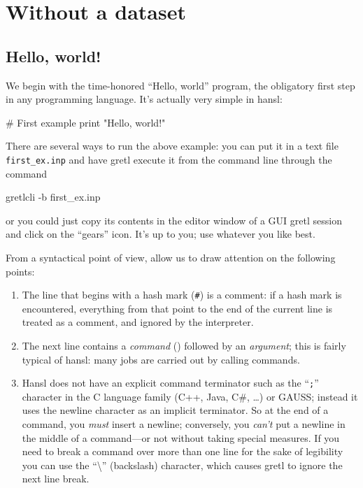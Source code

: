 \part{Without a dataset}

\chapter{Hello, world!}

We begin with the time-honored ``Hello, world'' program, the
obligatory first step in any programming language. It's actually very
simple in hansl:
\begin{code}
  # First example
  print "Hello, world!"
\end{code}

There are several ways to run the above example: you can put it in a
text file \texttt{first\_ex.inp} and have gretl execute it from the
command line through the command
\begin{code}
  gretlcli -b first_ex.inp
\end{code}
or you could just copy its contents in the editor window of a GUI
gretl session and click on the ``gears'' icon. It's up to you; use
whatever you like best.

From a syntactical point of view, allow us to draw attention on
the following points:
\begin{enumerate}
\item The line that begins with a hash mark (\texttt{\#}) is a
  comment: if a hash mark is encountered, everything from that point
  to the end of the current line is treated as a comment, and ignored
  by the interpreter.
\item The next line contains a \emph{command} () followed
  by an \emph{argument}; this is fairly typical of hansl: many jobs
  are carried out by calling commands.
\item Hansl does not have an explicit command terminator such as the
  ``\texttt{;}'' character in the C language family (C++, Java, C\#,
  \ldots) or GAUSS; instead it uses the newline character as an
  implicit terminator. So at the end of a command, you \emph{must}
  insert a newline; conversely, you \emph{can't} put a newline in the
  middle of a command---or not without taking special measures. If you
  need to break a command over more than one line for the sake of
  legibility you can use the ``\textbackslash'' (backslash) character,
  which causes gretl to ignore the next line break.
\end{enumerate}

